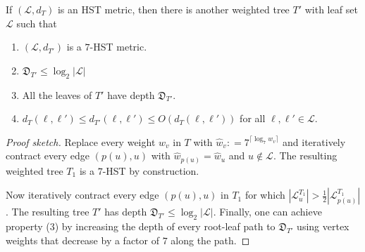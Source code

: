 \documentclass{toc}
\newcommand{\calL}{\mathcal L}
\newcommand{\depth}{\mathfrak{D}}
\newcommand{\seteq}{\mathrel{\mathop:}=}
\begin{document}
%
\begin{lemma}%
	If $(\calL,d_T)$ is an HST metric, then there is another weighted tree $T'$ with leaf set $\calL$
	such that
	\begin{enumerate}
		\item $(\calL,d_{T'})$ is a $7$-HST metric.
		\item  $\depth_{T'} \leq \log_2 |\calL|$
		\item All the leaves of $T'$ have depth $\depth_{T'}$.
		\item $d_T(\ell,\ell') \leq d_{T'}(\ell,\ell') \leq O(d_T(\ell,\ell'))$ for all $\ell,\ell' \in \calL$.
	\end{enumerate}
\end{lemma}
\begin{proof}[Proof sketch]
	Replace every weight $w_v$ in $T$ with $\hat{w}_v \seteq 7^{\lceil \log_7 w_v\rceil}$ and iteratively contract every edge $(p(u),u)$
	with $\hat{w}_{p(u)}=\hat{w}_u$ and $u \notin \calL$.
	The resulting weighted tree $T_1$ is a $7$-HST by construction.
	
	Now iteratively contract every edge $(p(u),u)$ in $T_1$ for which $|\calL^{T_1}_{u}| > \frac12 |\calL^{T_1}_{p(u)}|$.
	The resulting tree $T'$ has depth $\depth_{T'} \leq \log_2 |\calL|$.
	Finally, one can achieve property (3) by increasing the depth of every root-leaf path to $\depth_{T'}$
	using vertex weights that decrease by a factor of $7$ along the path.
\end{proof}
\end{document}
